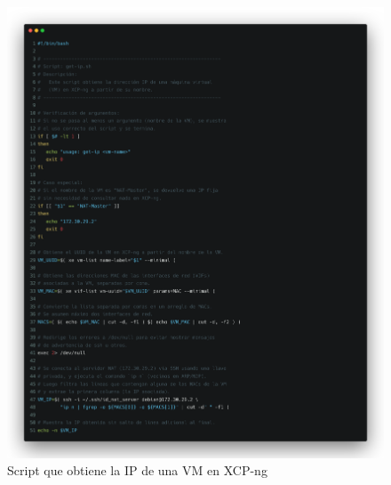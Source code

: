 \begin{figure}[H]
    \centering
    \includegraphics[width=\textwidth]{tablas-images/cp6/src/get-ip.png}
    \caption{Script que obtiene la IP de una VM en XCP-ng}\label{fig:get-ip}
\end{figure}

